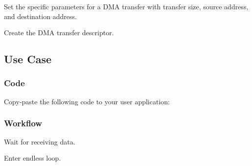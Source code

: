 \begin{DoxyEnumerate}
\item Set the specific parameters for a D\+M\+A transfer with transfer size, source address, and destination address. 
\begin{DoxyCodeInclude}
\end{DoxyCodeInclude}

\item Create the D\+M\+A transfer descriptor. 
\begin{DoxyCodeInclude}
\end{DoxyCodeInclude}
 
\end{DoxyEnumerate}\hypertarget{asfdoc_sam0_sercom_usart_dma_use_case_asfdoc_sam0_usart_dma_use_case_main}{}\subsection{Use Case}\label{asfdoc_sam0_sercom_usart_dma_use_case_asfdoc_sam0_usart_dma_use_case_main}
\hypertarget{asfdoc_sam0_sercom_usart_dma_use_case_asfdoc_sam0_usart_dma_use_case_main_code}{}\subsubsection{Code}\label{asfdoc_sam0_sercom_usart_dma_use_case_asfdoc_sam0_usart_dma_use_case_main_code}
Copy-\/paste the following code to your user application\+: 
\begin{DoxyCodeInclude}
\end{DoxyCodeInclude}
 \hypertarget{asfdoc_sam0_sercom_usart_dma_use_case_asfdoc_sam0_usart_dma_use_case_main_flow}{}\subsubsection{Workflow}\label{asfdoc_sam0_sercom_usart_dma_use_case_asfdoc_sam0_usart_dma_use_case_main_flow}

\begin{DoxyEnumerate}
\item Wait for receiving data. 
\begin{DoxyCodeInclude}
\end{DoxyCodeInclude}

\item Enter endless loop. 
\begin{DoxyCodeInclude}
\end{DoxyCodeInclude}

\end{DoxyEnumerate}